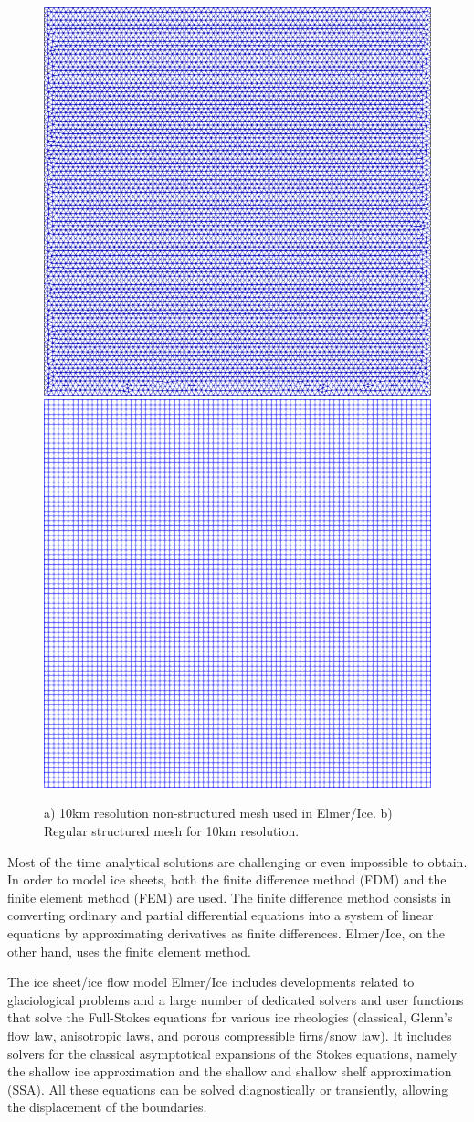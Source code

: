 \documentclass{article}
\begin{document}
\begin{figure}[!h]
	\centering
	\includegraphics[width=0.45\linewidth]{../fig/non_structured_grid_10km.png}
	\includegraphics[width=0.45\linewidth]{../fig/regular_grid_10km.png}
	\caption{a) 10km resolution non-structured mesh used in Elmer/Ice. b) Regular structured mesh for 10km resolution.}
	\label{meshes}
\end{figure}

Most of the time analytical solutions are challenging or even impossible to obtain. In order to model ice sheets, both the finite difference method (FDM) and the finite element method (FEM) are used. The finite difference method consists in converting ordinary and partial differential equations into a system of linear equations by approximating derivatives as finite differences. Elmer/Ice, on the other hand, uses the finite element method.

The ice sheet/ice flow model Elmer/Ice includes developments related to glaciological problems and a large number of dedicated solvers and user functions that solve the Full-Stokes equations for various ice rheologies (classical, Glenn's flow law, anisotropic laws, and porous compressible firns/snow law). It includes solvers for the classical asymptotical expansions of the Stokes equations, namely the shallow ice approximation and the shallow and shallow shelf approximation (SSA). All these equations can be solved diagnostically or transiently, allowing the displacement of the boundaries.
\end{document}
